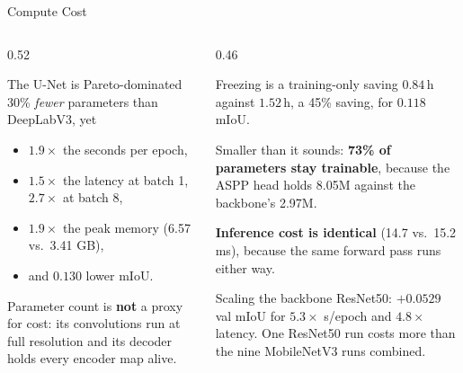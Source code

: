 \begin{frame}{Compute Cost}
\small
\begin{columns}[T]
\begin{column}{0.52\textwidth}
\begin{block}{The U-Net is Pareto-dominated}
30\% \emph{fewer} parameters than DeepLabV3, yet
\begin{itemize}
    \item $1.9\times$ the seconds per epoch,
    \item $1.5\times$ the latency at batch 1, $2.7\times$ at batch 8,
    \item $1.9\times$ the peak memory (6.57 vs.\ 3.41 GB),
    \item and $0.130$ lower mIoU.
\end{itemize}
Parameter count is \textbf{not} a proxy for cost: its convolutions run at full resolution and its
decoder holds every encoder map alive.
\end{block}
\end{column}
\begin{column}{0.46\textwidth}
\begin{block}{Freezing is a training-only saving}
$0.84$\,h against $1.52$\,h, a 45\% saving, for $0.118$ mIoU.

Smaller than it sounds: \textbf{73\% of parameters stay trainable}, because the ASPP head holds
8.05M against the backbone's 2.97M.

\textbf{Inference cost is identical} (14.7 vs.\ 15.2 ms), because the same forward pass runs either way.
\end{block}
\begin{alertblock}{Scaling the backbone}
ResNet50: $+0.0529$ val mIoU for $5.3\times$ s/epoch and $4.8\times$ latency. One ResNet50 run
costs more than the nine MobileNetV3 runs combined.
\end{alertblock}
\end{column}
\end{columns}
\end{frame}

